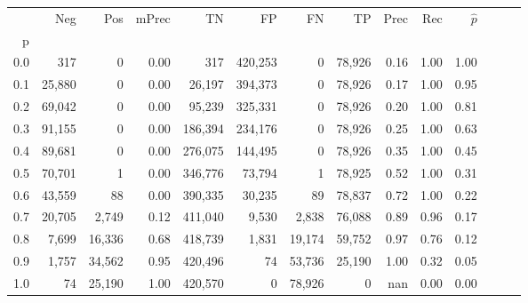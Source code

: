 \begin{tabular}{rrrrrrrrrrrrrr}
\toprule
{} &     Neg &     Pos & mPrec &       TN &       FP &      FN &      TP &  Prec &   Rec & $\hat{p}$ \\
p   &         &         &       &          &          &         &         &       &       &           \\
\midrule
0.0 &     317 &       0 &  0.00 &      317 &  420,253 &       0 &  78,926 &  0.16 &  1.00 &      1.00 \\
0.1 &  25,880 &       0 &  0.00 &   26,197 &  394,373 &       0 &  78,926 &  0.17 &  1.00 &      0.95 \\
0.2 &  69,042 &       0 &  0.00 &   95,239 &  325,331 &       0 &  78,926 &  0.20 &  1.00 &      0.81 \\
0.3 &  91,155 &       0 &  0.00 &  186,394 &  234,176 &       0 &  78,926 &  0.25 &  1.00 &      0.63 \\
0.4 &  89,681 &       0 &  0.00 &  276,075 &  144,495 &       0 &  78,926 &  0.35 &  1.00 &      0.45 \\
0.5 &  70,701 &       1 &  0.00 &  346,776 &   73,794 &       1 &  78,925 &  0.52 &  1.00 &      0.31 \\
0.6 &  43,559 &      88 &  0.00 &  390,335 &   30,235 &      89 &  78,837 &  0.72 &  1.00 &      0.22 \\
0.7 &  20,705 &   2,749 &  0.12 &  411,040 &    9,530 &   2,838 &  76,088 &  0.89 &  0.96 &      0.17 \\
0.8 &   7,699 &  16,336 &  0.68 &  418,739 &    1,831 &  19,174 &  59,752 &  0.97 &  0.76 &      0.12 \\
0.9 &   1,757 &  34,562 &  0.95 &  420,496 &       74 &  53,736 &  25,190 &  1.00 &  0.32 &      0.05 \\
1.0 &      74 &  25,190 &  1.00 &  420,570 &        0 &  78,926 &       0 &   nan &  0.00 &      0.00 \\
\bottomrule
\end{tabular}
